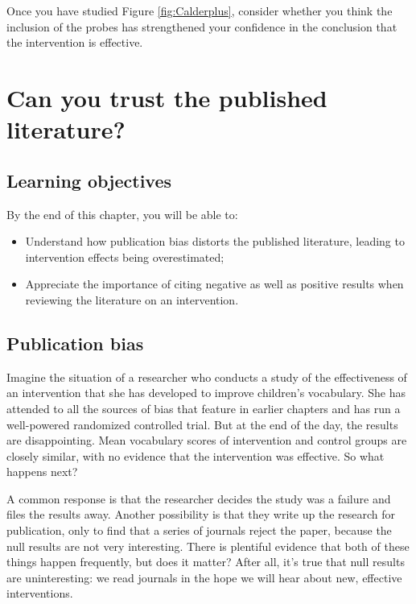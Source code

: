 \documentclass{krantz}
\begin{document}
Once you have studied Figure \ref{fig:Calderplus}, consider whether you think the inclusion of the probes has strengthened your confidence in the conclusion that the intervention is effective.

\hypertarget{pubbias}{%
\chapter{Can you trust the published literature?}\label{pubbias}}

\hypertarget{learning-objectives-19}{%
\section{Learning objectives}\label{learning-objectives-19}}

By the end of this chapter, you will be able to:

\begin{itemize}
\item
  Understand how publication bias distorts the published literature, leading to intervention effects being overestimated;
\item
  Appreciate the importance of citing negative as well as positive results when reviewing the literature on an intervention.
\end{itemize}

\hypertarget{publication-bias}{%
\section{Publication bias}\label{publication-bias}}

Imagine the situation of a researcher who conducts a study of the effectiveness of an intervention that she has developed to improve children's vocabulary. She has attended to all the sources of bias that feature in earlier chapters and has run a well-powered randomized controlled trial. But at the end of the day, the results are disappointing. Mean vocabulary scores of intervention and control groups are closely similar, with no evidence that the intervention was effective. So what happens next?

A common response is that the researcher decides the study was a failure and files the results away. Another possibility is that they write up the research for publication, only to find that a series of journals reject the paper, because the null results are not very interesting. There is plentiful evidence that both of these things happen frequently, but does it matter? After all, it's true that null results are uninteresting: we read journals in the hope we will hear about new, effective interventions.
\end{document}
